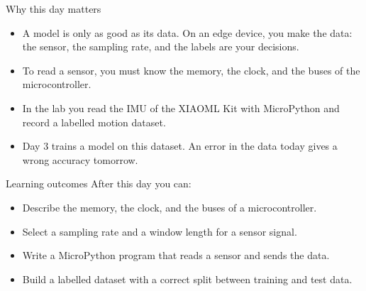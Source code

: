 \begin{frame}{Why this day matters}
  \begin{itemize}
    \item A model is only as good as its data. On an edge device, you make
          the data: the sensor, the sampling rate, and the labels are your
          decisions.
    \item To read a sensor, you must know the memory, the clock, and the
          buses of the microcontroller.
    \item In the lab you read the IMU of the XIAOML Kit with MicroPython
          and record a labelled motion dataset.
    \item Day 3 trains a model on this dataset. An error in the data today
          gives a wrong accuracy tomorrow.
  \end{itemize}
\end{frame}

\begin{frame}{Learning outcomes}
  After this day you can:
  \begin{itemize}
    \item Describe the memory, the clock, and the buses of a
          microcontroller.
    \item Select a sampling rate and a window length for a sensor signal.
    \item Write a MicroPython program that reads a sensor and sends the
          data.
    \item Build a labelled dataset with a correct split between training
          and test data.
  \end{itemize}
\end{frame}
